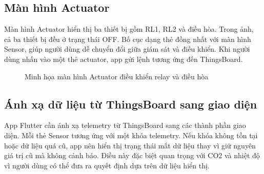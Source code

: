 \subsection{Màn hình Actuator}
Màn hình Actuator hiển thị ba thiết bị gồm RL1, RL2 và điều hòa. Trong ảnh, cả ba thiết bị đều ở trạng thái OFF. Bố cục dạng thẻ đồng nhất với màn hình Sensor, giúp người dùng dễ chuyển đổi giữa giám sát và điều khiển. Khi người dùng nhấn vào một thẻ actuator, app gửi lệnh tương ứng đến ThingsBoard.

\begin{figure}[h!]
    \centering
    \caption{Minh họa màn hình Actuator điều khiển relay và điều hòa}
    \label{fig:app_actuator}
\end{figure}

\subsection{Ánh xạ dữ liệu từ ThingsBoard sang giao diện}
App Flutter cần ánh xạ telemetry từ ThingsBoard sang các thành phần giao diện. Mỗi thẻ Sensor tương ứng với một khóa telemetry. Nếu khóa không tồn tại hoặc dữ liệu quá cũ, app nên hiển thị trạng thái mất dữ liệu thay vì giữ nguyên giá trị cũ mà không cảnh báo. Điều này đặc biệt quan trọng với CO2 và nhiệt độ vì người dùng có thể đưa ra quyết định dựa trên dữ liệu hiển thị.

